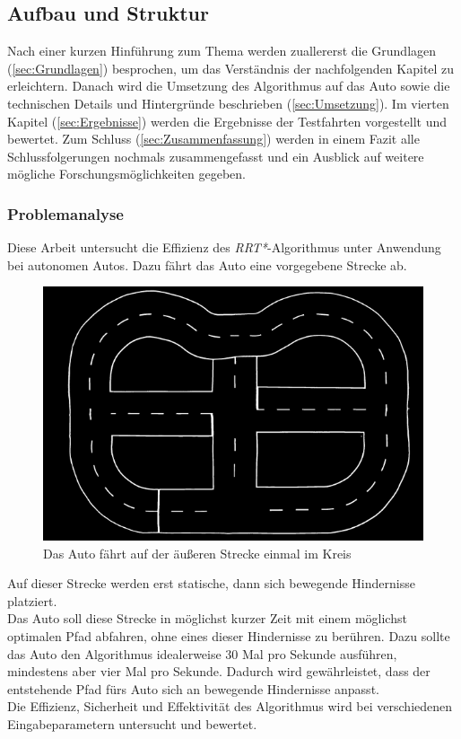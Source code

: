 \subsection{Aufbau und Struktur}
Nach einer kurzen Hinführung zum Thema werden zuallererst die Grundlagen (\ref{sec:Grundlagen}) besprochen, um das Verständnis der nachfolgenden Kapitel zu erleichtern. Danach wird die Umsetzung des Algorithmus auf das Auto sowie die technischen Details und Hintergründe beschrieben (\ref{sec:Umsetzung}). Im vierten Kapitel (\ref{sec:Ergebnisse}) werden die Ergebnisse der Testfahrten vorgestellt und bewertet. Zum Schluss (\ref{sec:Zusammenfassung}) werden in einem Fazit alle Schlussfolgerungen nochmals zusammengefasst und ein Ausblick auf weitere mögliche Forschungsmöglichkeiten gegeben. \\ 
\subsubsection{Problemanalyse}
\label{sec:Problemanalyse}
Diese Arbeit untersucht die Effizienz des\textit{ RRT*}-Algorithmus unter Anwendung bei autonomen Autos. Dazu fährt das Auto eine vorgegebene Strecke ab.
\begin{figure}
\centering
\includegraphics[scale=0.5]{Bilder/fu_robotics_lab_map_600x400.png} 
\caption{Das Auto fährt auf der äußeren Strecke einmal im Kreis}
\end{figure}
 Auf dieser Strecke werden erst statische, dann sich bewegende Hindernisse platziert. \\
Das Auto soll diese Strecke in möglichst kurzer Zeit mit einem möglichst optimalen Pfad abfahren, ohne eines dieser Hindernisse zu berühren. Dazu sollte das Auto den Algorithmus idealerweise 30 Mal pro Sekunde ausführen, mindestens aber vier Mal pro Sekunde. Dadurch wird gewährleistet, dass der entstehende Pfad fürs Auto sich an bewegende Hindernisse anpasst. \\
Die Effizienz, Sicherheit und Effektivität des Algorithmus wird bei verschiedenen Eingabeparametern untersucht und bewertet. \\

